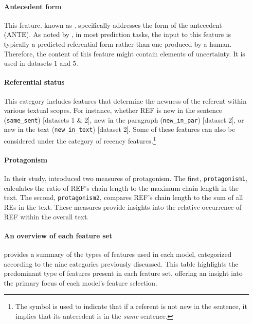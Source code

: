 \paragraph*{Antecedent form} This feature, known as , specifically addresses the form of the antecedent (ANTE). As noted by \citet{bohnet2008g}, in most prediction tasks, the input to this feature is typically a predicted referential form rather than one produced by a human. Therefore, the content of this feature might contain elements of uncertainty. It is used in datasets 1 and 5.


\paragraph*{Referential status} This category includes features that determine the newness of the referent within various textual scopes. For instance, whether REF is new in the sentence (\texttt{same\_sent}) [datasets 1 \& 2], new in the paragraph (\texttt{new\_in\_par}) [dataset 2], or new in the text (\texttt{new\_in\_text}) [dataset 2]. Some of these features can also be considered under the category of recency features.\footnote{The symbol  is used to indicate that if a referent is not new in the sentence, it implies that its antecedent is in the \emph{same} sentence.}

\paragraph*{Protagonism} 
In their study, \citet{kibrik2016referential} introduced two measures of protagonism. The first, \texttt{protagonism1}, calculates the ratio of REF's chain length to the maximum chain length in the text. The second, \texttt{protagonism2}, compares REF's chain length to the sum of all REs in the text. These measures provide insights into the relative occurrence of REF within the overall text.



\paragraph*{An overview of each feature set} 
 provides a summary of the types of features used in each model, categorized according to the nine categories previously discussed. This table highlights the predominant type of features present in each feature set, offering an insight into the primary focus of each model's feature selection.

